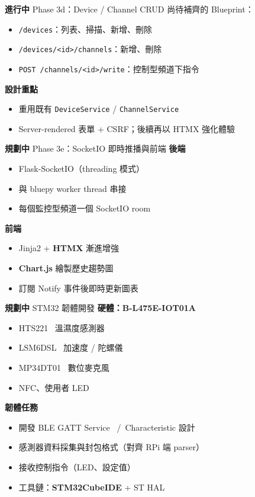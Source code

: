 \documentclass[10pt,aspectratio=169]{beamer}
\newcommand{\ip}[1]{\textcolor{accent}{\textbf{#1}}}
\newcommand{\pl}[1]{\textcolor{planned}{\textbf{#1}}}
\begin{document}
\begin{frame}{\ip{進行中} Phase 3d：Device / Channel CRUD}
  尚待補齊的 Blueprint：
  \begin{itemize}
    \item \texttt{/devices}：列表、掃描、新增、刪除
    \item \texttt{/devices/<id>/channels}：新增、刪除
    \item \texttt{POST /channels/<id>/write}：控制型頻道下指令
  \end{itemize}

  \vspace{0.6em}
  \textbf{設計重點}
  \begin{itemize}
    \item 重用既有 \texttt{DeviceService} / \texttt{ChannelService}
    \item Server-rendered 表單 + CSRF；後續再以 HTMX 強化體驗
  \end{itemize}
\end{frame}

\begin{frame}{\pl{規劃中} Phase 3e：SocketIO 即時推播與前端}
  \textbf{後端}
  \begin{itemize}
    \item Flask-SocketIO（threading 模式）
    \item 與 bluepy worker thread 串接
    \item 每個監控型頻道一個 SocketIO room
  \end{itemize}

  \textbf{前端}
  \begin{itemize}
    \item Jinja2 + \textbf{HTMX} 漸進增強
    \item \textbf{Chart.js} 繪製歷史趨勢圖
    \item 訂閱 Notify 事件後即時更新圖表
  \end{itemize}
\end{frame}

\begin{frame}{\pl{規劃中} STM32 韌體開發}
  \textbf{硬體：B-L475E-IOT01A}
  \begin{itemize}
    \item HTS221 \, 溫濕度感測器
    \item LSM6DSL \, 加速度 / 陀螺儀
    \item MP34DT01 \, 數位麥克風
    \item NFC、使用者 LED
  \end{itemize}

  \textbf{韌體任務}
  \begin{itemize}
    \item 開發 BLE GATT Service \, /\, Characteristic 設計
    \item 感測器資料採集與封包格式（對齊 RPi 端 parser）
    \item 接收控制指令（LED、設定值）
    \item 工具鏈：\textbf{STM32CubeIDE} + ST HAL
  \end{itemize}
\end{frame}
\end{document}
